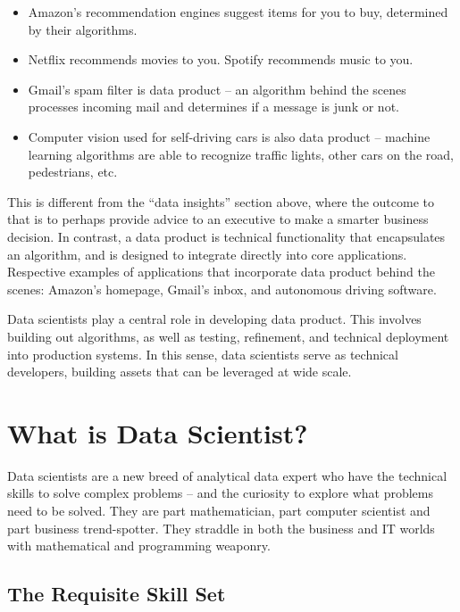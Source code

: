 \documentclass[
]{book}
\providecommand{\tightlist}{%
  \setlength{\itemsep}{0pt}\setlength{\parskip}{0pt}}
\begin{document}
\begin{itemize}
\tightlist
\item
  Amazon's recommendation engines suggest items for you to buy, determined by their algorithms.
\item
  Netflix recommends movies to you. Spotify recommends music to you.
\item
  Gmail's spam filter is data product -- an algorithm behind the scenes processes incoming mail and determines if a message is junk or not.
\item
  Computer vision used for self-driving cars is also data product -- machine learning algorithms are able to recognize traffic lights, other cars on the road, pedestrians, etc.
\end{itemize}

This is different from the ``data insights'' section above, where the outcome to that is to perhaps provide advice to an executive to make a smarter business decision. In contrast, a data product is technical functionality that encapsulates an algorithm, and is designed to integrate directly into core applications. Respective examples of applications that incorporate data product behind the scenes: Amazon's homepage, Gmail's inbox, and autonomous driving software.

Data scientists play a central role in developing data product. This involves building out algorithms, as well as testing, refinement, and technical deployment into production systems. In this sense, data scientists serve as technical developers, building assets that can be leveraged at wide scale.

\hypertarget{what-is-data-scientist}{%
\section{What is Data Scientist?}\label{what-is-data-scientist}}

Data scientists are a new breed of analytical data expert who have the technical skills to solve complex problems -- and the curiosity to explore what problems need to be solved. They are part mathematician, part computer scientist and part business trend-spotter. They straddle in both the business and IT worlds with mathematical and programming weaponry.

\hypertarget{the-requisite-skill-set}{%
\subsection{The Requisite Skill Set}\label{the-requisite-skill-set}}
\end{document}

